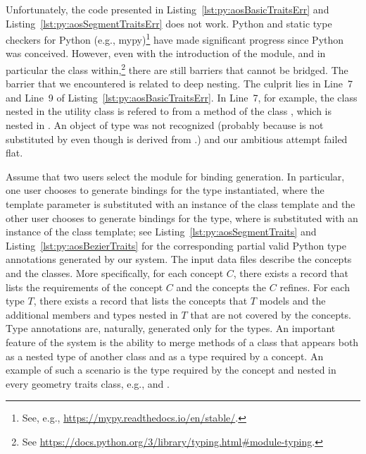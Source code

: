 Unfortunately, the code presented in
Listing~\ref{lst:py:aosBasicTraitsErr} and
Listing~\ref{lst:py:aosSegmentTraitsErr} does not work. Python and static
type checkers for Python (e.g., mypy)\footnote{See, e.g.,
  \url{https://mypy.readthedocs.io/en/stable/}.} have made significant
progress since Python was conceived. However, even with the
introduction of the  module, and in particular the
 class within,\footnote{See
  \url{https://docs.python.org/3/library/typing.html\#module-typing}.}
there are still barriers that cannot be bridged. The barrier that we
encountered is related to deep nesting. The culprit lies in Line~7 and
Line~9 of Listing~\ref{lst:py:aosBasicTraitsErr}. In Line~7, for example,
the class  nested in the utility class
 is refered to from a method of the
class , which is nested in
. An object of type
 was not recognized
(probably because  is not
substituted by  even though
 is derived from
.) and our ambitious attempt failed
flat.

Assume that two users select the \iiDArrangementsPackage{} module for
binding generation. In particular, one user chooses to generate
bindings for the 
type instantiated, where the template parameter 
 is substituted with an instance of
the  class template and the other
user chooses to generate bindings for the
 type, where
 is substituted with an instance of the
 class template; see
Listing~\ref{lst:py:aosSegmentTraits} and
Listing~\ref{lst:py:aosBezierTraits} for the corresponding partial
valid Python type annotations generated by our system. The input data
files describe the concepts and the classes. More specifically, for
each concept $C$, there exists a record that lists the requirements of
the concept $C$ and the concepts the $C$ refines. For each type $T$,
there exists a record that lists the concepts that $T$ models and the
additional members and types nested in $T$ that are not covered by the
concepts. Type annotations are, naturally, generated only for the
types. An important feature of the system is the ability to merge
methods of a class that appears both as a nested type of another class
and as a type required by a concept. An example of such a scenario is
the  type required by the concept
 and nested in every geometry traits
class, e.g.,  and
.

